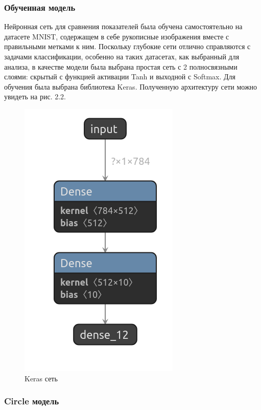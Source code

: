 \subsubsection{Обученная модель}

Нейронная сеть для сравнения показателей была обучена самостоятельно на датасете MNIST, содержащем в себе рукописные изображения вместе с правильными метками к ним. Поскольку глубокие сети отлично справляются с задачами классификации, особенно на таких датасетах, как выбранный для анализа, в качестве модели была выбрана простая сеть с 2 полносвязными слоями: скрытый с функцией активации Tanh и выходной с Softmax. Для обучения была выбрана библиотека Keras. Полученную архитектуру сети можно увидеть на рис. 2.2.

\begin{figure}[H]
    \begin{center}
        \includegraphics[scale=0.35]{tex/inc/img/keras.png}
        \caption{Keras сеть}
    \end{center}
\end{figure}

\subsubsection{Circle модель}

